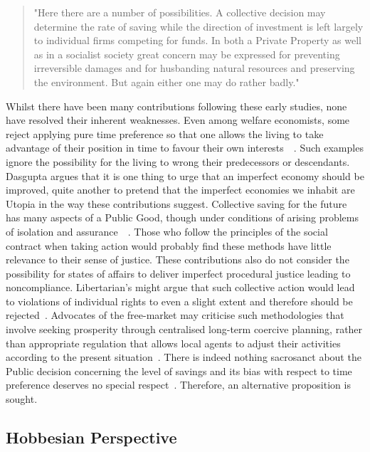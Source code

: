 \documentclass[11pt, oneside]{article}   	%
\begin{document}
\begin{quote}
"Here there are a number of possibilities. A collective decision may determine the rate of saving while the direction of investment is left largely to individual firms competing for funds. In both a Private Property as well as in a socialist society great concern may be expressed for preventing irreversible damages and for husbanding natural resources and preserving the environment. But again either one may do rather badly."~\cite{jr1}
\end{quote}

Whilst there have been many contributions following these early studies, none have resolved their inherent weaknesses.
Even among welfare economists, some reject applying pure time preference so that one allows the living to take advantage of their position in time to favour their own interests~\cite{hs1}~\cite{fr1}.
Such examples ignore the possibility for the living to wrong their predecessors or descendants.
Dasgupta argues that it is one thing to urge that an imperfect economy should be improved, quite another to pretend that the imperfect economies we inhabit are Utopia in the way these contributions suggest.
Collective saving for the future has many aspects of a Public Good, though under conditions of arising problems of isolation and assurance~\cite{as1}~\cite{ms1}.
Those who follow the principles of the social contract when taking action would probably find these methods have little relevance to their sense of justice.
These contributions also do not consider the possibility for states of affairs to deliver imperfect procedural justice leading to noncompliance.
Libertarian's might argue that such collective action would lead to violations of individual rights to even a slight extent and therefore should be rejected~\cite{rn1}.
Advocates of the free-market may criticise such methodologies that involve seeking prosperity through centralised long-term coercive planning, rather than appropriate regulation that allows local agents to adjust their activities according to the present situation~\cite{fh1}.
There is indeed nothing sacrosanct about the Public decision concerning the level of savings and its bias with respect to time preference deserves no special respect~\cite{jr1}.
Therefore, an alternative proposition is sought.\\

\subsection{Hobbesian Perspective}
\end{document}

